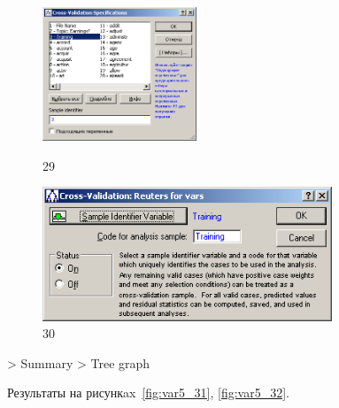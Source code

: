 \begin{figure}[!h]
  \centering

  \begin{minipage}{0.49\textwidth}
    \centering

    \includegraphics[height=4cm]
    {inc/var5/29.PNG}

    \caption{29}

    \label{fig:var5_29}
  \end{minipage}
  \begin{minipage}{0.49\textwidth}
    \centering

    \includegraphics[height=4cm]
    {inc/var5/30.PNG}

    \caption{30}

    \label{fig:var5_30}
  \end{minipage}
\end{figure}

\newpage

> Summary > Tree graph

Результаты на рисункax~\ref{fig:var5_31}, \ref{fig:var5_32}.

